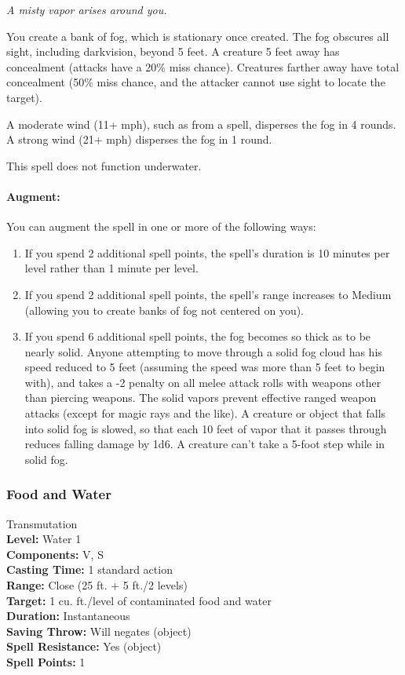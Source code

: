 \emph{A misty vapor arises around you. }

You create a bank of fog, which is stationary once created. 
The fog obscures all sight, including darkvision, beyond 5 feet. 
A creature 5 feet away has concealment (attacks have a 20\% miss chance). 
Creatures farther away have total concealment (50\% miss chance, and the attacker cannot use sight to locate the target).

A moderate wind (11+ mph), such as from a  spell, disperses the fog in 4 rounds. 
A strong wind (21+ mph) disperses the fog in 1 round. 

This spell does not function underwater.

\paragraph{Augment:} You can augment the spell in one or more of the following ways:
\begin{enumerate}
 \item If you spend 2 additional spell points, the spell's duration is 10 minutes per level rather than 1 minute per level.
 \item If you spend 2 additional spell points, the spell's range increases to Medium (allowing you to create banks of fog not centered on you).
 \item If you spend 6 additional spell points, the fog becomes so thick as to be nearly solid. Anyone attempting to move through a solid fog cloud
has his speed reduced to 5 feet (assuming the speed was more than 5 feet to begin with), and takes a -2 penalty on all melee attack rolls with weapons other
than piercing weapons. The solid vapors prevent effective ranged weapon attacks (except for magic rays and the like). A creature or object that falls into
solid fog is slowed, so that each 10 feet of vapor that it passes through reduces falling damage by 1d6.
A creature can't take a 5-foot step while in solid fog.
\end{enumerate}
\subsubsection{Food and Water}
\label{Spell:FoodAndWater}
Transmutation
\\ \textbf{Level:} Water 1
\\ \textbf{Components:} V, S
\\ \textbf{Casting Time:} 1 standard action
\\ \textbf{Range:} Close (25 ft. + 5 ft./2 levels)
\\ \textbf{Target:} 1 cu. ft./level of contaminated food and water
\\ \textbf{Duration:} Instantaneous
\\ \textbf{Saving Throw:} Will negates (object)
\\ \textbf{Spell Resistance:} Yes (object)
\\ \textbf{Spell Points:} 1

